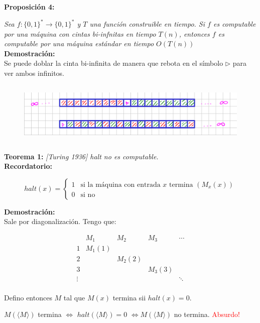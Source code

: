 \documentclass{article}
\begin{document}
\begin{flushleft}
  \textbf{Proposición 4:}

  \textit{Sea $f : \{0,1\}^* \rightarrow \{0,1\}^*$ y $T$ una función construible en tiempo. Si $f$
  es computable por una máquina con cintas bi-infnitas en tiempo $T(n)$, entonces $f$ es computable
  por una máquina estándar en tiempo $O(T(n))$}\\[0.5em]

  \textbf{\textcolor{Mulberry}{Demostración:}} \\[0.5em]

  Se puede doblar la cinta bi-infinita de manera que rebota en el símbolo $\triangleright$ para 
  ver ambos infinitos.

  \begin{figure}[h] 
    \centering 
    \includegraphics[width=13cm, height=3cm]{./imagenes/biinfinita_a_infinita.png}
  \end{figure}
\end{flushleft}

\pagebreak

\begin{flushleft}
  \textbf{Teorema 1:}
  \textit{[Turing 1936] halt no es computable.}\\[0.5em]

  \textbf{\textcolor{OliveGreen}{Recordatorio:}}

  \[
    halt(x) = 
    \begin{cases}
    1 & \text{si la máquina con entrada } x \text{ termina } (M_x(x)) \\
    0 & \text{si no}
    \end{cases}
  \]

  \textbf{\textcolor{Mulberry}{Demostración:}} \\[0.5em]

  Sale por diagonalización. Tengo que:
  
  \[
    \begin{array}{c|cccc}
    & M_1 & M_2 & M_3 & \cdots \\
    \hline
    1 & M_1(1) &  &  & \\
    2 &  & M_2(2) &  & \\
    3 &  &  & M_3(3) & \\
    \vdots &  &  &  & \ddots \\
    \end{array}
  \]

  Defino entonces $M$ tal que $M(x)$ termina sii $halt(x) = 0$.

  $M(\langle M \rangle)$ termina $\iff$ $halt(\langle M \rangle) = 0$ $ \iff M(\langle M \rangle)$ 
  no termina. \textcolor{Red}{Absurdo!}
\end{flushleft}
\end{document}
